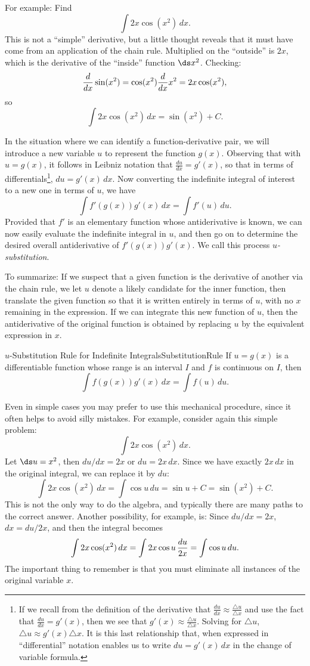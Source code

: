 For example: Find
$$\int 2x\cos(x^2)\,dx.$$
This is not a ``simple'' derivative, but a little thought reveals that
it must have come from an application of the chain rule. Multiplied
on the ``outside'' is $2x$, which is the derivative of the ``inside''
function $\ds x^2$. Checking:
$${d\over dx}\sin(x^2)  = \cos(x^2){d\over dx}x^2 = 2x\cos(x^2),$$
so 
$$\int 2x\cos(x^2)\,dx=\sin(x^2)+C .$$

In the situation where we can identify a function-derivative pair, we will introduce a new variable $u$ to represent the function $g(x)$.  Observing that with $u = g(x)$, it follows in Leibniz notation that $\frac{du}{dx} = g'(x)$, so that in terms of differentials\footnote{If we recall from the definition of the derivative that $\frac{du}{dx} \approx \frac{\triangle{u}}{\triangle{x}}$ and use the fact that $\frac{du}{dx} = g'(x)$, then we see that $g'(x) \approx \frac{\triangle{u}}{\triangle{x}}$.  Solving for $\triangle u$, $\triangle u \approx g'(x) \triangle x$.  It is this last relationship that, when expressed in ``differential'' notation enables us to write $du = g'(x) \, dx$ in the change of variable formula.}, $du = g'(x)\, dx$.  Now converting the indefinite integral of interest to a new one in terms of $u$, we have  
$$\int f'(g(x)) g'(x) \, dx = \int f'(u) \,du.$$
Provided that $f'$ is an elementary function whose antiderivative is known, we can now easily evaluate the indefinite integral in $u$, and then go on to determine the desired overall antiderivative of $f'(g(x)) g'(x)$.  We call this process \emph{$u$-substitution}. 

To summarize: If we suspect that a given function is the derivative of
another via the chain rule, we let $u$ denote a likely candidate for
the inner function, then translate the given function so that it is
written entirely in terms of $u$, with no $x$ remaining in the
expression. If we can integrate this new function of $u$, then the
antiderivative of the original function is obtained by replacing $u$
by the equivalent expression in $x$.

\begin{theorem}{$ u $-Substitution Rule for Indefinite Integrals}{SubstitutionRule}
If $u=g(x)$ is a differentiable function whose range is an interval $I$ and $f$ is continuous on $I$, then
$$\int f(g(x))g'(x)\,dx=\int f(u)\,du.$$
\end{theorem}

Even in simple cases you may prefer to use this mechanical procedure,
since it often helps to avoid silly mistakes. For example, consider
again this simple problem:
$$\int 2x\cos(x^2)\,dx.$$
Let $\ds u=x^2$, then $du/dx = 2x$ or $du = 2x\,dx$. Since we have exactly 
$2x\,dx$ in the original integral, we can replace it by $du$:
$$\int 2x\cos(x^2)\,dx=\int \cos u\,du=\sin u +C = \sin(x^2)+C.$$
This is not the only way to do the algebra, and typically there are
many paths to the correct answer. Another possibility, for example,
is: Since $du/dx = 2x$, $dx=du/2x$, and then the integral becomes
$$\int 2x\cos(x^2)\,dx=\int 2x\cos u\,{du\over 2x}=\int \cos u\,du.$$
The important thing to remember is that you must eliminate all
instances of the original variable $x$.


